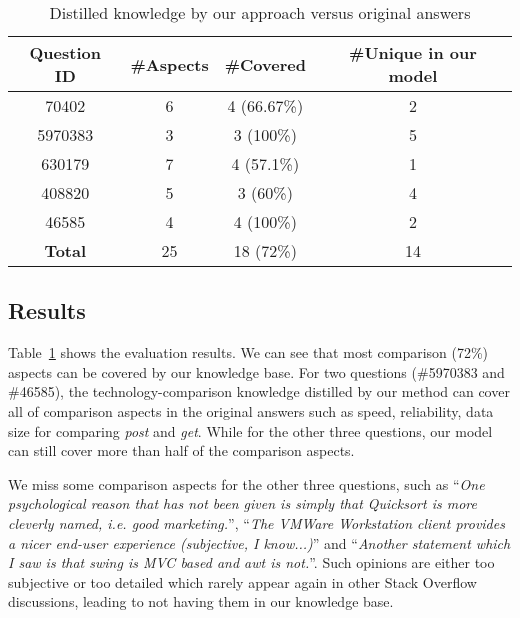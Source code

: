 \begin{table}
	\centering
	\caption{Distilled knowledge by our approach versus original answers}
	\vspace{-3mm}
	\setlength{\tabcolsep}{0.3em}
	\begin{tabular}{cccc}
	\hline
	\textbf{Question ID} & \textbf{\#Aspects} & \textbf{\#Covered} & \textbf{\#Unique in our model} \\ \hline
	70402   & 6  & 4 (66.67\%)   & 2 \\
	5970383 & 3  & 3  (100\%)  & 5 \\
	630179  & 7  & 4  (57.1\%)  & 1 \\
	408820  & 5  & 3  (60\%) & 4 \\
	46585   & 4  & 4  (100\%) & 2\\
	\hline
	\textbf{Total} & 25 & 18 (72\%) & 14\\
	\hline
	\end{tabular}	
	\vspace{-1mm}
	\label{tab:usefulenessEvaluation}
\end{table}


\subsection{Results}
Table~\ref{tab:usefulenessEvaluation} shows the evaluation results.
We can see that most comparison (72\%) aspects can be covered by our knowledge base.
For two questions (\#5970383 and \#46585), the technology-comparison knowledge distilled by our method can cover all of comparison aspects in the original answers such as speed, reliability, data size for comparing \textit{post} and \textit{get}.
While for the other three questions, our model can still cover more than half of the comparison aspects.

We miss some comparison aspects for the other three questions, such as ``\textit{One psychological reason that has not been given is simply that Quicksort is more cleverly named, i.e. good marketing.}'', ``\textit{The VMWare Workstation client provides a nicer end-user experience (subjective, I know...)}'' and ``\textit{Another statement which I saw is that swing is MVC based and awt is not.}''.
Such opinions are either too subjective or too detailed which rarely appear again in other Stack Overflow discussions, leading to not having them in our knowledge base.

